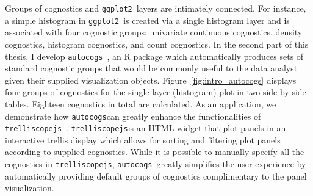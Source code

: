 \documentclass[stat,dissertation]{puthesis}\usepackage[]{graphicx}\usepackage{xcolor}
\newcommand{\pkg}[1]{\texttt{#1}}
\newcommand{\ggplot}{\pkg{ggplot2}}
\newcommand{\trelliscopejs}{\pkg{trelliscopejs}}
\newcommand{\autocogs}{\pkg{autocogs}}
\begin{document}
Groups of cognostics and \ggplot~layers are intimately connected.  For instance, a simple histogram in \ggplot~is created via a single histogram layer and is associated with four cognostic groups: univariate continuous cognostics, density cognostics, histogram cognostics, and count cognostics.
In the second part of this thesis, I develop \autocogs~\cite{github_autocogs}, an R package which automatically produces sets of standard cognostic groups that would be commonly useful to the data analyst given their supplied visualization objects.
Figure~\ref{fig:intro_autocogs} displays four groups of cognostics for the single layer (histogram) plot in two side-by-side tables.  Eighteen cognostics in total are calculated.  As an application, we demonstrate how \autocogs can greatly enhance the functionalities of  \trelliscopejs~\cite{r_trelliscopejs}.
\trelliscopejs is an HTML widget that plot panels in an interactive trellis display which allows for sorting and filtering plot panels according to supplied cognostics.
While it is possible to manually specify all the cognostics in \trelliscopejs, \autocogs~greatly simplifies the user experience by automatically providing default groups of cognostics complimentary to the panel visualization.
\end{document}
